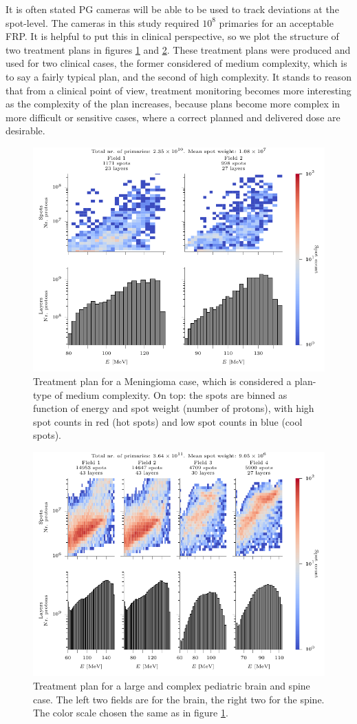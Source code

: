 \documentclass[a4paper,english,12pt]{article}
\begin{document}
It is often stated PG cameras will be able to be used to track deviations at the spot-level. The cameras in this study required $10^8$ primaries for an acceptable FRP. It is helpful to put this in clinical perspective, so we plot the structure of two treatment plans in figures \ref{fig:planmid} and \ref{fig:planhigh}. These treatment plans were produced and used for two clinical cases, the former considered of medium complexity, which is to say a fairly typical plan, and the second of high complexity. It stands to reason that from a clinical point of view, treatment monitoring becomes more interesting as the complexity of the plan increases, because plans become more complex in more difficult or sensitive cases, where a correct planned and delivered dose are desirable.

\begin{figure}[htp]
  \centering
  \includegraphics[width=0.8\linewidth]{MENINGIOMA_F1nonorm-plot}
  \caption{Treatment plan for a Meningioma case, which is considered a plan-type of medium complexity. On top: the spots are binned as function of energy and spot weight (number of protons), with high spot counts in red (hot spots) and low spot counts in blue (cool spots).}
  \label{fig:planmid}
\end{figure}

\begin{figure}[htp]
  \centering
  \includegraphics[width=0.8\linewidth]{CSI_F1nonorm-plot}
  \caption{Treatment plan for a large and complex pediatric brain and spine case. The left two fields are for the brain, the right two for the spine. The color scale chosen the same as in figure \ref{fig:planmid}.}
  \label{fig:planhigh}
\end{figure}
\end{document}
